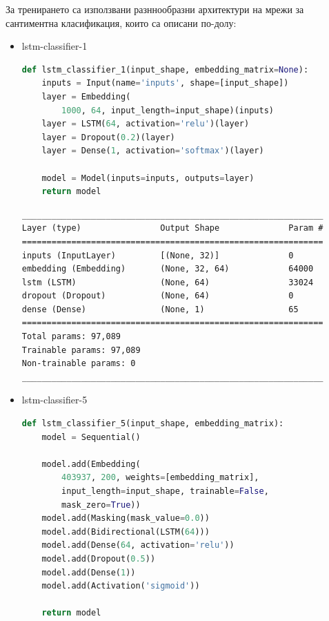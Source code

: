 \documentclass{article}
\begin{document}
За тренирането са използвани разннообразни архитектури на мрежи за сантиментна класификация, които са описани по-долу:

\begin{itemize}
  \item lstm-classifier-1

\begin{lstlisting}[language=Python, caption=Дефиниция на lstm-classifier-1.]
def lstm_classifier_1(input_shape, embedding_matrix=None):
    inputs = Input(name='inputs', shape=[input_shape])
    layer = Embedding(
        1000, 64, input_length=input_shape)(inputs)
    layer = LSTM(64, activation='relu')(layer)
    layer = Dropout(0.2)(layer)
    layer = Dense(1, activation='softmax')(layer)

    model = Model(inputs=inputs, outputs=layer)
    return model
\end{lstlisting}

\begin{lstlisting}[numbers=none, caption=Обобщение на lstm-classifier-1.]
_____________________________________________________________
Layer (type)                Output Shape              Param #
=============================================================
inputs (InputLayer)         [(None, 32)]              0
embedding (Embedding)       (None, 32, 64)            64000
lstm (LSTM)                 (None, 64)                33024
dropout (Dropout)           (None, 64)                0
dense (Dense)               (None, 1)                 65
=============================================================
Total params: 97,089
Trainable params: 97,089
Non-trainable params: 0
_____________________________________________________________
\end{lstlisting}

  \item lstm-classifier-5

\begin{lstlisting}[language=Python, caption=Дефиниция на lstm-classifier-5.]
def lstm_classifier_5(input_shape, embedding_matrix):
    model = Sequential()

    model.add(Embedding(
        403937, 200, weights=[embedding_matrix],
        input_length=input_shape, trainable=False,
        mask_zero=True))
    model.add(Masking(mask_value=0.0))
    model.add(Bidirectional(LSTM(64)))
    model.add(Dense(64, activation='relu'))
    model.add(Dropout(0.5))
    model.add(Dense(1))
    model.add(Activation('sigmoid'))

    return model
\end{lstlisting}


\end{itemize}
\end{document}
